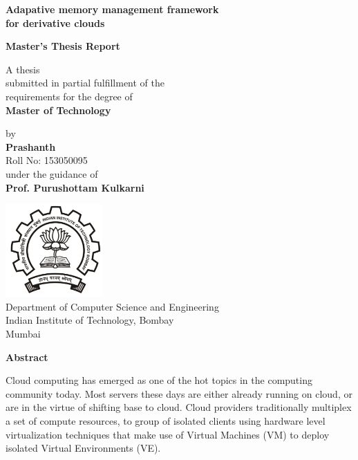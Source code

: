 \documentclass[11pt,a4paper,openright]{report}
\newcommand{\putiitblogo}{\includegraphics[width=10em]{iitb-black}}
\begin{document}
  \begin{titlepage}    
    \begin{center}
   
      \Large \textbf{Adapative memory management framework \\for derivative clouds}  \\
      \vspace{5em}
      
      \large \textbf{Master's Thesis Report} \\
      \vspace{5em}
      
      \normalsize A thesis \\submitted in partial fulfillment of the \\requirements for the degree of \\
      \vspace{1em}      
      \large \textbf{Master of Technology} \\
      \vspace{5em}
      
      \normalsize by \\
      \vspace{1em}      
      \large \textbf{Prashanth} \\ 
      \vspace{0.5em}
      \normalsize Roll No: 153050095 \\
      
      \vspace{5em}
      \normalsize under the guidance of \\
      \vspace{0.5em}      
      \large \textbf{Prof. Purushottam Kulkarni} \\
      \vspace{5em}
      
      \putiitblogo \\
      \Large 
      Department of Computer Science and Engineering \\
      Indian Institute of Technology, Bombay \\
      Mumbai
      
    \end{center}
  \end{titlepage} 
  
  \begin{center}
    \huge \textbf{Abstract}
  \end{center}
  \vspace*{3em}
  \normalsize 
    Cloud computing has emerged as one of the hot topics in the computing community today. Most servers these days are either 
already running on cloud, or are in the virtue of shifting base to cloud. Cloud providers traditionally multiplex a set of compute 
resources, to group of isolated clients using hardware level virtualization techniques that make use of Virtual Machines (VM) to deploy 
isolated Virtual Environments (VE). 
\end{document}
